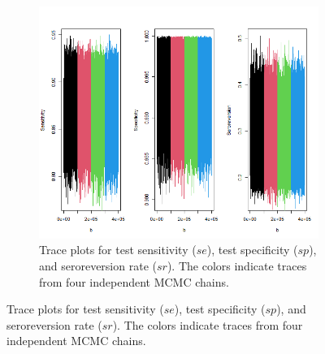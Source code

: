 \captionsetup[subfigure]{labelformat=empty}
\begin{figure}[ht!]
\centering
\begin{subfigure}[b]{\columnwidth} 
    \includegraphics[width=\columnwidth]{../../plot/trace_global.png}
    \caption{Trace plots for test sensitivity ($se$), test specificity ($sp$), and seroreversion rate ($sr$). The colors indicate traces from four independent MCMC chains.}
    \label{fig:global_trace}
\end{subfigure}
\end{figure}